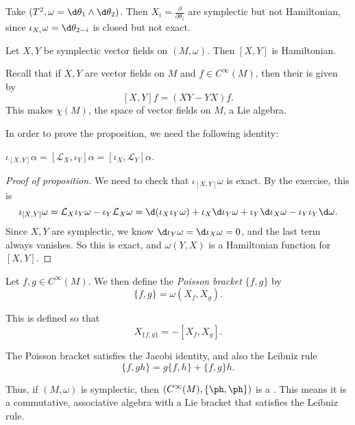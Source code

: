 \documentclass[a4paper]{article}
\begin{document}
\begin{eg}
  Take $(T^2, \omega = \d \theta_1 \wedge \d \theta_2)$. Then $X_i = \frac{\partial}{\partial \theta_i}$ are symplectic but not Hamiltonian, since $\iota_{X_i} \omega = \d \theta_{2 - i}$ is closed but not exact.
\end{eg}

\begin{prop}
  Let $X, Y$ be symplectic vector fields on $(M, \omega)$. Then $[X, Y]$ is Hamiltonian.
\end{prop}
Recall that if $X, Y$ are vector fields on $M$ and $f \in C^\infty(M)$, then their  is given by
\[
  [X, Y]f = (XY - YX)f.
\]
This makes $\chi(M)$, the space of vector fields on $M$, a Lie algebra.

In order to prove the proposition, we need the following identity:
\begin{ex}
  $\iota_{[X, Y]}\alpha = [\mathcal{L}_X, \iota_Y] \alpha = [\iota_X, \mathcal{L}_Y] \alpha$.
\end{ex}

\begin{proof}[Proof of proposition]
  We need to check that $\iota_{[X, Y]} \omega$ is exact. By the exercise, this is
  \[
    \iota_{[X, Y]}\omega = \mathcal{L}_X \iota_Y \omega - \iota_Y \mathcal{L}_X \omega = \d (\iota_X \iota_Y \omega) + \iota_X \d \iota_Y \omega + \iota_Y \d \iota_X \omega - \iota_Y \iota_Y \d \omega.
  \]
  Since $X, Y$ are symplectic, we know $\d \iota_Y \omega = \d \iota_X \omega = 0$, and the last term always vanishes. So this is exact, and $\omega(Y, X)$ is a Hamiltonian function for $[X, Y]$.
\end{proof}

\begin{defi}
  Let $f, g \in C^\infty(M)$. We then define the \emph{Poisson bracket} $\{f, g\}$ by
  \[
    \{f, g\} = \omega(X_f, X_g).
  \]
\end{defi}
This is defined so that
\[
  X_{\{f, g\}} = -[X_f, X_g].
\]
\begin{ex}
  The Poisson bracket satisfies the Jacobi identity, and also the Leibniz rule
  \[
    \{f, gh\} = g\{f, h\} + \{f, g\}h.
  \]
\end{ex}
Thus, if $(M, \omega)$ is symplectic, then $(C^\infty(M), \{\ph, \ph\})$ is a . This means it is a commutative, associative algebra with a Lie bracket that satisfies the Leibniz rule.
\end{document}
